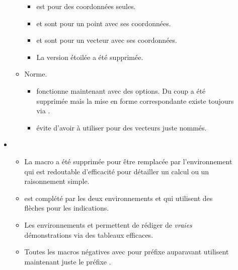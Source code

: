 \documentclass[12pt,a4paper]{book}
\begin{document}
\begin{description}
\begin{itemize}[itemsep=.5em]
\begin{itemize}[itemsep=.5em]
\begin{itemize}[itemsep=.5em, label=$\rightarrow$]
            \item {} est pour des coordonnées seules.

            \item {} et  sont pour un point avec ses coordonnées.

            \item {} et  sont pour un vecteur avec ses coordonnées.

            \item La version étoilée  a été supprimée. 
	    \end{itemize}



        \item Norme.
        
        \begin{itemize}[itemsep=.5em, label=$\rightarrow$]
            \item {} fonctionne maintenant avec des options.
                  Du coup  a été supprimée mais la mise en forme correspondante existe toujours via .

			\item {} évite d'avoir à utiliser  pour des vecteurs juste nommés.
	    \end{itemize}
    \end{itemize}




    \separation
    \item {}
    \begin{itemize}[itemsep=.5em]
        \item La macro  a été supprimée pour être remplacée par l'environnement  qui est redoutable d'efficacité pour détailler un calcul ou un raisonnement simple.
        
        \item {} est complété par les deux environnements  et  qui utilisent des flèches pour les indications.

        \item Les environnements  et  permettent de rédiger de \emph{\og vraies \fg} démonstrations via des tableaux efficaces.

        \item Toutes les macros négatives avec pour préfixe  auparavant utilisent maintenant juste le préfixe .


\end{itemize}
\end{itemize}
\end{description}
\end{document}
